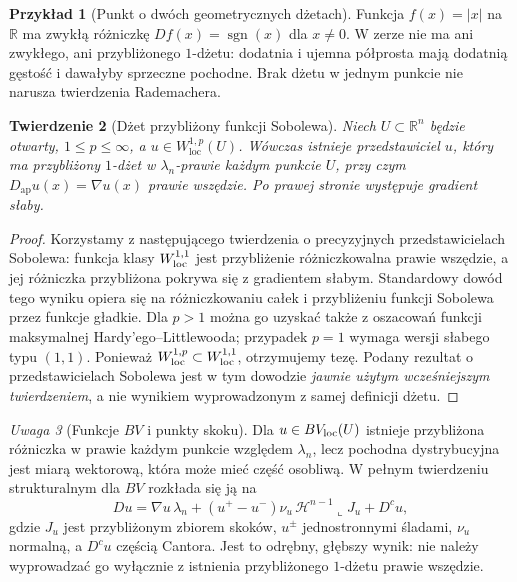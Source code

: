 \documentclass[11pt,a4paper,oneside]{book}
\numberwithin{equation}{chapter}
\theoremstyle{plain}
\newtheorem{twierdzenie}{Twierdzenie}[chapter]
\theoremstyle{definition}
\newtheorem{przyklad}[twierdzenie]{Przykład}
\theoremstyle{remark}
\newtheorem{uwaga}[twierdzenie]{Uwaga}
\begin{document}
\begin{przyklad}[Punkt o dwóch geometrycznych dżetach]
Funkcja $f(x)=|x|$ na $\mathbb R$ ma zwykłą różniczkę
$Df(x)=\operatorname{sgn}(x)$ dla $x\ne0$.
W zerze nie ma ani zwykłego, ani przybliżonego
$1$-dżetu: dodatnia i ujemna półprosta mają dodatnią
gęstość i dawałyby sprzeczne pochodne. Brak dżetu w jednym
punkcie nie narusza twierdzenia Rademachera.
\end{przyklad}

\begin{twierdzenie}[Dżet przybliżony funkcji Sobolewa]
\label{thm:dzety-sobolev}
Niech $U\subset\mathbb R^n$ będzie otwarty,
$1\le p\le\infty$, a $u\in W_{\mathrm{loc}}^{1,p}(U)$.
Wówczas istnieje przedstawiciel $u$, który ma
przybliżony $1$-dżet w $\lambda_n$-prawie każdym
punkcie $U$, przy czym
$D_{\mathrm{ap}}u(x)=\nabla u(x)$ prawie wszędzie.
Po prawej stronie występuje gradient słaby.
\end{twierdzenie}
\begin{proof}
Korzystamy z następującego twierdzenia o precyzyjnych
przedstawicielach Sobolewa: funkcja klasy $W^{1,1}_{\rm loc}$
jest przybliżenie różniczkowalna prawie wszędzie, a jej
różniczka przybliżona pokrywa się z gradientem słabym.
Standardowy dowód tego wyniku opiera się na różniczkowaniu
całek i przybliżeniu funkcji Sobolewa przez funkcje gładkie.
Dla $p>1$ można go uzyskać także z oszacowań funkcji
maksymalnej Hardy'ego--Littlewooda; przypadek $p=1$
wymaga wersji słabego typu $(1,1)$. Ponieważ
$W^{1,p}_{\rm loc}\subset W^{1,1}_{\rm loc}$,
otrzymujemy tezę. Podany rezultat o przedstawicielach
Sobolewa jest w tym dowodzie \emph{jawnie użytym
wcześniejszym twierdzeniem}, a nie wynikiem wyprowadzonym
z samej definicji dżetu.
\end{proof}

\begin{uwaga}[Funkcje $BV$ i punkty skoku]
\label{rem:dzety-bv}
Dla $u\in BV_{\rm loc}(U)$ istnieje przybliżona
różniczka w prawie każdym punkcie względem $\lambda_n$,
lecz pochodna dystrybucyjna jest miarą wektorową, która
może mieć część osobliwą. W pełnym twierdzeniu
strukturalnym dla $BV$ rozkłada się ją na
\[
 Du=\nabla u\,\lambda_n
 +(u^+-u^-)\nu_u\,\mathcal H^{n-1}\llcorner J_u+D^cu,
\]
gdzie $J_u$ jest przybliżonym zbiorem skoków,
$u^\pm$ jednostronnymi śladami, $\nu_u$ normalną,
a $D^cu$ częścią Cantora. Jest to odrębny, głębszy wynik:
nie należy wyprowadzać go wyłącznie z istnienia
przybliżonego $1$-dżetu prawie wszędzie.
\end{uwaga}
\end{document}
